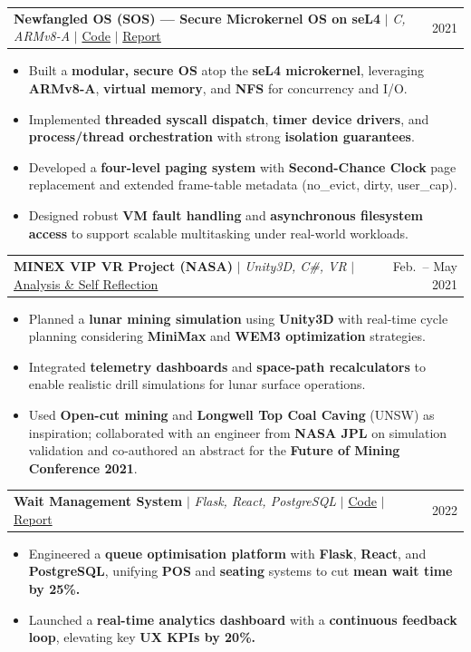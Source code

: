 \documentclass[letterpaper,9pt]{article}
\makeatletter
\newcommand{\resumeItem}[1]{
  \item\small{#1}
}
\newcommand{\resumeProjectHeading}[2]{
    \item
    \begin{tabular*}{\textwidth}{l@{\extracolsep{\fill}}r}
      \small#1 & \small #2 \\
    \end{tabular*}\vspace{-5pt}
}
\newcommand{\resumeItemListStart}{\begin{itemize}[leftmargin=0.18in, itemsep=0.5pt, topsep=1pt, parsep=0pt]}
\newcommand{\resumeItemListEnd}{\end{itemize}\vspace{-3pt}}
\makeatother
\begin{document}
      \vspace{2pt}
    \resumeProjectHeading
      {\textbf{Newfangled OS (SOS) --- Secure Microkernel OS on seL4} $|$ \emph{C, ARMv8-A} $|$ \href{https://github.com/ChasingTheDream369/Newfangled-Operating-System-over-seL4-Microkernel}{Code} $|$ \href{https://github.com/ChasingTheDream369/Newfangled-Operating-System-over-seL4-Microkernel}{Report}}{2021}
      \resumeItemListStart
        \resumeItem{Built a \textbf{modular, secure OS} atop the \textbf{seL4 microkernel}, leveraging \textbf{ARMv8-A}, \textbf{virtual memory}, and \textbf{NFS} for concurrency and I/O.}
        \resumeItem{Implemented \textbf{threaded syscall dispatch}, \textbf{timer device drivers}, and \textbf{process/thread orchestration} with strong \textbf{isolation guarantees}.}
        \resumeItem{Developed a \textbf{four-level paging system} with \textbf{Second-Chance Clock} page replacement and extended frame-table metadata (no\_evict, dirty, user\_cap).}
        \resumeItem{Designed robust \textbf{VM fault handling} and \textbf{asynchronous filesystem access} to support scalable multitasking under real-world workloads.}
      \resumeItemListEnd

      \vspace{2pt}
    \resumeProjectHeading
      {\textbf{MINEX VIP VR Project (NASA)} $|$ \emph{Unity3D, C\#, VR} $|$ \href{https://drive.google.com/file/d/1VVn5TE0ZY79KwCU68WvhGLq0mscCIfhw/view}{Analysis \& Self Reflection}}{Feb.\ -- May 2021}
      \resumeItemListStart
        \resumeItem{Planned a \textbf{lunar mining simulation} using \textbf{Unity3D} with real-time cycle planning considering \textbf{MiniMax} and \textbf{WEM3 optimization} strategies.}
        \resumeItem{Integrated \textbf{telemetry dashboards} and \textbf{space-path recalculators} to enable realistic drill simulations for lunar surface operations.}
        \resumeItem{Used \textbf{Open-cut mining} and \textbf{Longwell Top Coal Caving} (UNSW) as inspiration; collaborated with an engineer from \textbf{NASA JPL} on simulation validation and co-authored an abstract for the \textbf{Future of Mining Conference 2021}.}
      \resumeItemListEnd

      \vspace{2pt}
    \resumeProjectHeading
      {\textbf{Wait Management System} $|$ \emph{Flask, React, PostgreSQL} $|$ \href{https://github.com/ChasingTheDream369/Wait-Management-System/tree/main/capstone-project-comp3900-m18b-segmentationfault-main}{Code} $|$ \href{https://drive.google.com/file/d/1CG9ig_faPyU3_Y-nPpezMiMgq3anEqqX/view?usp=sharing}{Report}}{2022}
      \resumeItemListStart
        \resumeItem{Engineered a \textbf{queue optimisation platform} with \textbf{Flask}, \textbf{React}, and \textbf{PostgreSQL}, unifying \textbf{POS} and \textbf{seating} systems to cut \textbf{mean wait time by 25\%.}}
        \resumeItem{Launched a \textbf{real-time analytics dashboard} with a \textbf{continuous feedback loop}, elevating key \textbf{UX KPIs by 20\%.}}
      \resumeItemListEnd
\end{document}
